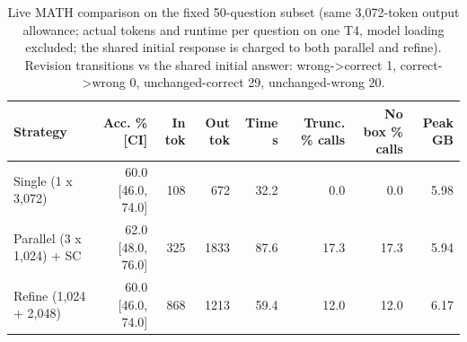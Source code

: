 \begin{table}[t]
\centering
\small
\caption{Live MATH comparison on the fixed 50-question subset (same 3,072-token output allowance; actual tokens and runtime per question on one T4, model loading excluded; the shared initial response is charged to both parallel and refine). Revision transitions vs the shared initial answer: wrong->correct 1, correct->wrong 0, unchanged-correct 29, unchanged-wrong 20.}
\label{tab:T7_live}
\begin{tabular}{lrrrrrrr}
\toprule
Strategy & Acc. \% [CI] & In tok & Out tok & Time s & Trunc. \% calls & No box \% calls & Peak GB \\
\midrule
Single (1 x 3,072) & 60.0 [46.0, 74.0] & 108 & 672 & 32.2 & 0.0 & 0.0 & 5.98 \\
Parallel (3 x 1,024) + SC & 62.0 [48.0, 76.0] & 325 & 1833 & 87.6 & 17.3 & 17.3 & 5.94 \\
Refine (1,024 + 2,048) & 60.0 [46.0, 74.0] & 868 & 1213 & 59.4 & 12.0 & 12.0 & 6.17 \\
\bottomrule
\end{tabular}
\end{table}
